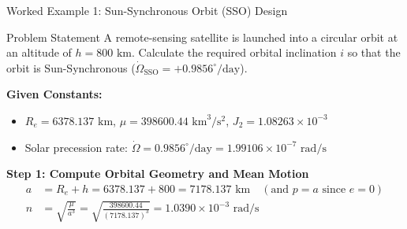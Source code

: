 \documentclass[aspectratio=169,11pt]{beamer}
\begin{document}
\begin{frame}{Worked Example 1: Sun-Synchronous Orbit (SSO) Design}
    \begin{exampleblock}{Problem Statement}
        A remote-sensing satellite is launched into a circular orbit at an altitude of $h = 800\text{ km}$. Calculate the required orbital inclination $i$ so that the orbit is Sun-Synchronous ($\dot{\Omega}_{\text{SSO}} = +0.9856^\circ/\text{day}$).
    \end{exampleblock}

    \textbf{Given Constants:}
    \begin{itemize}
        \item $R_e = 6378.137\text{ km}$, $\mu = 398600.44\text{ km}^3/\text{s}^2$, $J_2 = 1.08263 \times 10^{-3}$
        \item Solar precession rate: $\dot{\Omega} = 0.9856^\circ/\text{day} = 1.99106 \times 10^{-7}\text{ rad/s}$
    \end{itemize}

    \textbf{Step 1: Compute Orbital Geometry and Mean Motion}
    \begin{align*}
        a &= R_e + h = 6378.137 + 800 = 7178.137\text{ km} \quad (\text{and } p = a \text{ since } e=0) \\
        n &= \sqrt{\frac{\mu}{a^3}} = \sqrt{\frac{398600.44}{(7178.137)^3}} = 1.0390 \times 10^{-3}\text{ rad/s}
    \end{align*}
\end{frame}
\end{document}
